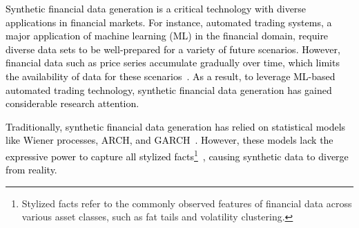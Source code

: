 \documentclass{article}
\newcommand{\takehiro}[1]{\textcolor{black}{#1}}
\begin{document}
\takehiro{Synthetic financial data generation is a critical technology with diverse applications in financial markets. For instance, automated trading systems, a major application of machine learning (ML) in the financial domain, require diverse data sets to be well-prepared for a variety of future scenarios. However, financial data such as price series accumulate gradually over time, which limits the availability of data for these scenarios~\cite{synthetic_data_overview}. As a result, to leverage ML-based automated trading technology, synthetic financial data generation has gained considerable research attention.}



\takehiro{Traditionally, synthetic financial data generation has relied on statistical models like Wiener processes, ARCH, and GARCH~\cite{engle1982autoregressive,bollerslev1986generalized}. However, these models lack the expressive power to capture all stylized facts\footnote{Stylized facts refer to the commonly observed features of financial data across various asset classes, such as fat tails and volatility clustering.}~\cite{malmsten2010stylized}, causing synthetic data to diverge from reality.}

\end{document}
